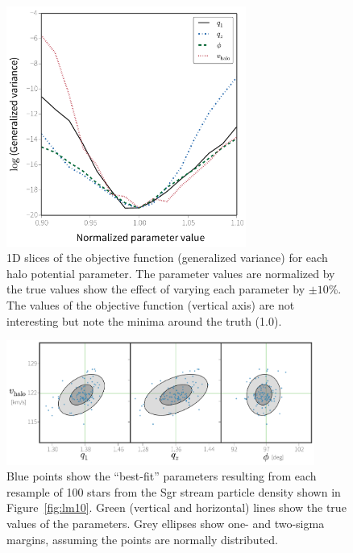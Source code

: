 \begin{figure}[h!]
\begin{center}
\includegraphics[width=0.7\textwidth]{figures/ch1/fig4.pdf}
\caption{ 1D slices of the objective function (generalized variance) for each halo potential parameter. The parameter values are normalized by the true values show the effect of varying each parameter by $\pm10$\%. The values of the objective function (vertical axis) are not interesting but note the minima around the truth (1.0).}\label{fig:objective}
\end{center}
\end{figure}

\begin{figure}[ht!]
\centering\includegraphics[width=0.9\textwidth,trim=0 0 0 0, clip]{figures/ch1/fig5.pdf}
\caption{ Blue points show the ``best-fit'' parameters resulting from each resample of 100 stars from the Sgr stream particle density shown in Figure~\ref{fig:lm10}. Green (vertical and horizontal) lines show the true values of the parameters. Grey ellipses show one- and two-sigma margins, assuming the points are normally distributed. }\label{fig:bootstrap}
\end{figure}	

